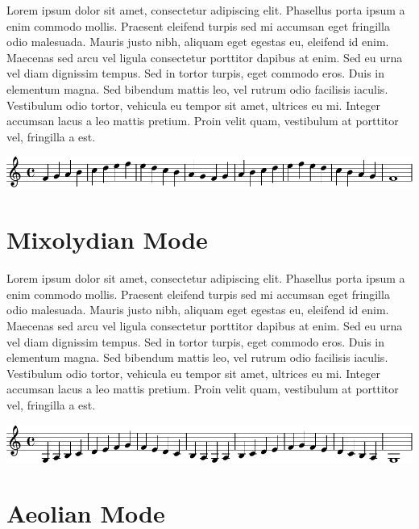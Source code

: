 \documentclass[11pt]{article}
\begin{document}
Lorem ipsum dolor sit amet, consectetur adipiscing elit. Phasellus
porta ipsum a enim commodo mollis. Praesent eleifend turpis sed mi
accumsan eget fringilla odio malesuada. Mauris justo nibh, aliquam
eget egestas eu, eleifend id enim. Maecenas sed arcu vel ligula
consectetur porttitor dapibus at enim. Sed eu urna vel diam dignissim
tempus. Sed in tortor turpis, eget commodo eros. Duis in elementum
magna. Sed bibendum mattis leo, vel rutrum odio facilisis iaculis.
Vestibulum odio tortor, vehicula eu tempor sit amet, ultrices eu mi.
Integer accumsan lacus a leo mattis pretium. Proin velit quam,
vestibulum at porttitor vel, fringilla a est.

\begin{center}
\includegraphics[width=.9\linewidth]{lydian.pdf}
\end{center}

\section*{Mixolydian Mode}
\label{sec:org9ce761f}

Lorem ipsum dolor sit amet, consectetur adipiscing elit. Phasellus
porta ipsum a enim commodo mollis. Praesent eleifend turpis sed mi
accumsan eget fringilla odio malesuada. Mauris justo nibh, aliquam
eget egestas eu, eleifend id enim. Maecenas sed arcu vel ligula
consectetur porttitor dapibus at enim. Sed eu urna vel diam dignissim
tempus. Sed in tortor turpis, eget commodo eros. Duis in elementum
magna. Sed bibendum mattis leo, vel rutrum odio facilisis iaculis.
Vestibulum odio tortor, vehicula eu tempor sit amet, ultrices eu mi.
Integer accumsan lacus a leo mattis pretium. Proin velit quam,
vestibulum at porttitor vel, fringilla a est.

\begin{center}
\includegraphics[width=.9\linewidth]{mixolydian.pdf}
\end{center}

\section*{Aeolian Mode}
\label{sec:org0b5e07b}
\end{document}
